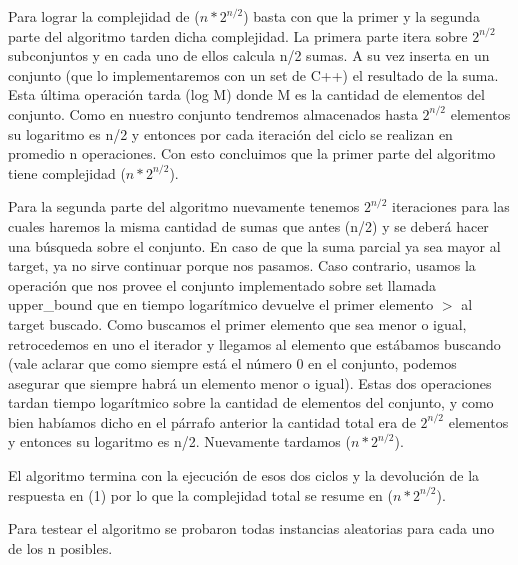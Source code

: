 Para lograr la complejidad de \bigo($n * 2 ^{n/2}$) basta con que la primer y la segunda parte del algoritmo tarden dicha complejidad.
La primera parte itera sobre $2 ^{n/2}$ subconjuntos y en cada uno de ellos calcula n/2 sumas. A su vez inserta en un conjunto (que lo implementaremos con un set de C++) el resultado de la suma. Esta última operación tarda \bigo(log M) donde M es la cantidad de elementos del conjunto. Como en nuestro conjunto tendremos almacenados hasta $2 ^{n/2}$ elementos su logaritmo es n/2 y entonces por cada iteración del ciclo se realizan en promedio n operaciones.
Con esto concluimos que la primer parte del algoritmo tiene complejidad  \bigo($n * 2 ^{n/2}$).

Para la segunda parte del algoritmo nuevamente tenemos $2 ^{n/2}$ iteraciones para las cuales haremos la misma cantidad de sumas que antes (n/2) y se deberá hacer una búsqueda sobre el conjunto. En caso de que la suma parcial ya sea mayor al target, ya no sirve continuar porque nos pasamos. Caso contrario, usamos la operación que nos provee el conjunto implementado sobre set llamada upper_bound que en tiempo logarítmico devuelve el primer elemento $>$ al target buscado. Como buscamos el primer elemento que sea menor o igual, retrocedemos en uno el iterador y llegamos al elemento que estábamos buscando (vale aclarar que como siempre está el número 0 en el conjunto, podemos asegurar que siempre habrá un elemento menor o igual). Estas dos operaciones tardan tiempo logarítmico sobre la cantidad de elementos del conjunto, y como bien habíamos dicho en el párrafo anterior la cantidad total era de $2 ^{n/2}$ elementos y entonces su logaritmo es n/2. Nuevamente tardamos \bigo($n * 2 ^{n/2}$).

El algoritmo termina con la ejecución de esos dos ciclos y la devolución de la respuesta en \bigo(1) por lo que la complejidad total se resume en \bigo($n * 2 ^{n/2}$).

Para testear el algoritmo se probaron todas instancias aleatorias para cada uno de los n posibles.
